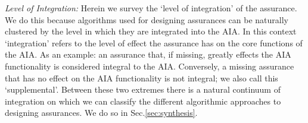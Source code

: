 \emph{Level of Integration:} Herein we survey the `level of integration' of the assurance. We do this because algorithms used for designing assurances can be naturally clustered by the level in which they are integrated into the AIA. In this context `integration' refers to the level of effect the assurance has on the core functions of the AIA. As an example: an assurance that, if missing, greatly effects the AIA functionality is considered integral to the AIA. Conversely, a missing assurance that has no effect on the AIA functionality is not integral; we also call this `supplemental'. Between these two extremes there is a natural continuum of integration on which we can classify the different algorithmic approaches to designing assurances. We do so in Sec.\ref{sec:synthesis}.
